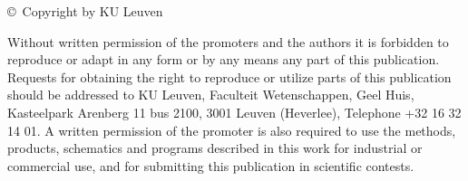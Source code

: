 \thispagestyle{empty}
\setlength{\parindent}{0cm}
\vspace*{\fill}

\copyright\ Copyright by KU Leuven \par
Without written permission of the promoters and the authors it is forbidden to reproduce or adapt in any form or by any means any part of this publication. Requests for obtaining the right to reproduce or utilize parts of this publication should be addressed to KU Leuven, Faculteit Wetenschappen, Geel Huis, Kasteelpark Arenberg 11 bus 2100, 3001 Leuven (Heverlee), Telephone +32 16 32 14 01.
A written permission of the promoter is also required to use the methods, products, schematics and programs described in this work for industrial or commercial use, and for submitting this publication in scientific contests. 

\setlength{\parindent}{0.5cm}
